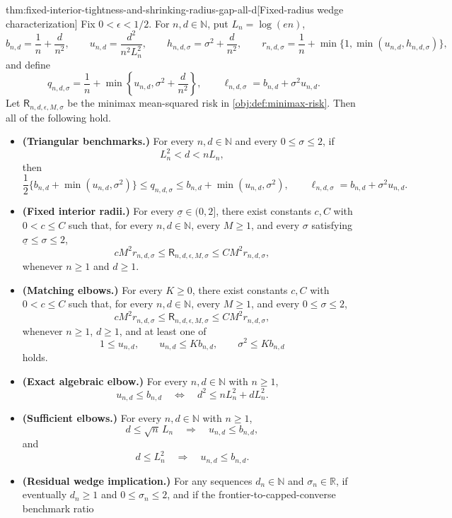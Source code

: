 \begin{theoremv}{thm:fixed-interior-tightness-and-shrinking-radius-gap-all-d}[Fixed-radius wedge characterization]
Fix \(0<\epsilon<1/2\).  For \(n,d\in\mathbb N\), put \(L_n=\log(en)\),
\[
b_{n,d}=\frac1n+\frac d{n^2},
\qquad
u_{n,d}=\frac{d^2}{n^2L_n^2},
\qquad
h_{n,d,\sigma}=\sigma^2+\frac d{n^2},
\qquad
r_{n,d,\sigma}=\frac1n+\min\{1,\min(u_{n,d},h_{n,d,\sigma})\},
\]
and define
\[
q_{n,d,\sigma}=\frac1n+\min\left\{u_{n,d},\sigma^2+\frac d{n^2}\right\},
\qquad
\ell_{n,d,\sigma}=b_{n,d}+\sigma^2u_{n,d}.
\]
Let \(\mathsf R_{n,d,\epsilon,M,\sigma}\) be the minimax mean-squared risk in \cref{obj:def:minimax-risk}.  Then all of the following hold.
\begin{itemize}
\item \textbf{(Triangular benchmarks.)} For every \(n,d\in\mathbb N\) and every \(0\le\sigma\le2\), if
\[
L_n^2<d<nL_n,
\]
then
\[
\frac12\{b_{n,d}+\min(u_{n,d},\sigma^2)\}
\le q_{n,d,\sigma}
\le b_{n,d}+\min(u_{n,d},\sigma^2),
\qquad
\ell_{n,d,\sigma}=b_{n,d}+\sigma^2u_{n,d}.
\]
\item \textbf{(Fixed interior radii.)} For every \(\underline\sigma\in(0,2]\), there exist constants \(c,C\) with \(0<c\le C\) such that, for every \(n,d\in\mathbb N\), every \(M\ge1\), and every \(\sigma\) satisfying \(\underline\sigma\le\sigma\le2\),
\[
cM^2r_{n,d,\sigma}
\le
\mathsf R_{n,d,\epsilon,M,\sigma}
\le
CM^2r_{n,d,\sigma},
\]
whenever \(n\ge1\) and \(d\ge1\).
\item \textbf{(Matching elbows.)} For every \(K\ge0\), there exist constants \(c,C\) with \(0<c\le C\) such that, for every \(n,d\in\mathbb N\), every \(M\ge1\), and every \(0\le\sigma\le2\),
\[
cM^2r_{n,d,\sigma}
\le
\mathsf R_{n,d,\epsilon,M,\sigma}
\le
CM^2r_{n,d,\sigma},
\]
whenever \(n\ge1\), \(d\ge1\), and at least one of
\[
1\le u_{n,d},
\qquad
u_{n,d}\le Kb_{n,d},
\qquad
\sigma^2\le Kb_{n,d}
\]
holds.
\item \textbf{(Exact algebraic elbow.)} For every \(n,d\in\mathbb N\) with \(n\ge1\),
\[
u_{n,d}\le b_{n,d}
\quad\Longleftrightarrow\quad
d^2\le nL_n^2+dL_n^2.
\]
\item \textbf{(Sufficient elbows.)} For every \(n,d\in\mathbb N\) with \(n\ge1\),
\[
d\le\sqrt n\,L_n \quad\Longrightarrow\quad u_{n,d}\le b_{n,d},
\]
and
\[
d\le L_n^2 \quad\Longrightarrow\quad u_{n,d}\le b_{n,d}.
\]
\item \textbf{(Residual wedge implication.)} For any sequences \(d_n\in\mathbb N\) and \(\sigma_n\in\mathbb R\), if eventually \(d_n\ge1\) and \(0\le\sigma_n\le2\), and if the frontier-to-capped-converse benchmark ratio

\end{itemize}
\end{theoremv}
